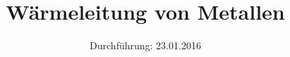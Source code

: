

\subject{Versuchsprotokoll zum Versuch Nr. 204}
\title{Wärmeleitung von Metallen}
\date{
  Durchführung: 23.01.2016
}



\maketitle
\newpage






\printbibliography


